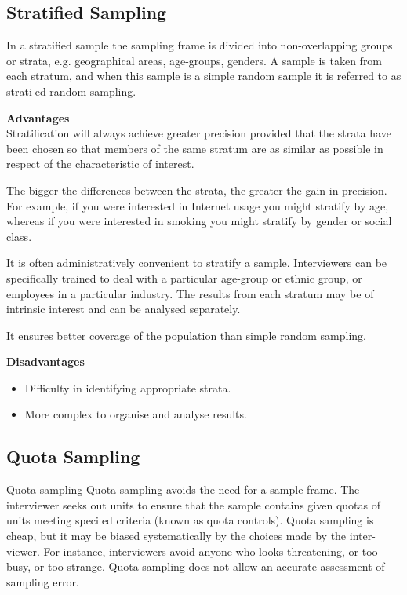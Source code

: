 \documentclass[12pt]{article}
\begin{document}
\subsection{Stratified Sampling}
In a stratified sample the sampling frame is divided into non-overlapping groups or strata, e.g.
geographical areas, age-groups, genders. A sample is taken from each stratum, and when this
sample is a simple random sample it is referred to as stratied random sampling.

\textbf{Advantages}\\
Stratification will always achieve greater precision provided that the strata have been chosen so
that members of the same stratum are as similar as possible in respect of the characteristic of
interest. 

The bigger the differences between the strata, the greater the gain in precision. For
example, if you were interested in Internet usage you might stratify by age, whereas if you were
interested in smoking you might stratify by gender or social class.

It is often administratively convenient to stratify a sample. Interviewers can be specifically trained
to deal with a particular age-group or ethnic group, or employees in a particular industry. The
results from each stratum may be of intrinsic interest and can be analysed separately.

It ensures better coverage of the population than simple random sampling.

\textbf{Disadvantages}\\
\begin{itemize}
\item Difficulty in identifying appropriate strata.
\item More complex to organise and analyse results.
\end{itemize}

\subsection{Quota Sampling}
Quota sampling
Quota sampling avoids the need for a sample frame. The interviewer seeks out units to ensure that
the sample contains given quotas of units meeting specied criteria (known as quota controls).
Quota sampling is cheap, but it may be biased systematically by the choices made by the inter-
viewer. For instance, interviewers avoid anyone who looks threatening, or too busy, or too strange.
Quota sampling does not allow an accurate assessment of sampling error.
\end{document}

